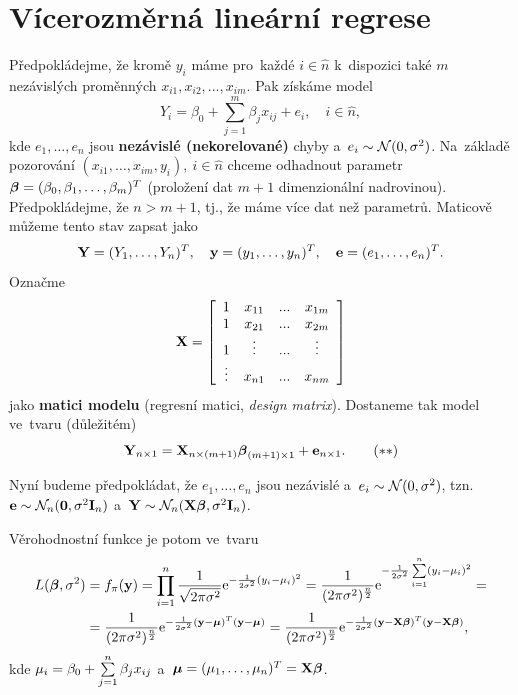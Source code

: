 \chapter{Vícerozměrná lineární regrese}

Předpokládejme, že kromě $y_i$ máme pro~každé $i\in\widehat{n}$ k~dispozici také $m$ nezávislých proměnných $x_{i1},x_{i2},\dots,x_{im}$. Pak získáme model
 $$ Y_i = \beta_0+\sum_{j = 1}^m \beta_j x_{ij}+e_i,\quad i\in\widehat{n}, $$
kde $e_1,\dots,e_n$ jsou \textbf{nezávislé (nekorelované)} chyby a~$e_i\sim\mathcal{N}(0,\sigma^2)$. Na~základě pozorování $(x_{i1},\dots,x_{im},y_i),~i\in\widehat{n}$ chceme odhadnout parametr $\boldsymbol{\beta} = (\beta_0,\beta_1,\dots,\beta_m)^T$ (proložení dat \linebreak $m+1$ dimenzionální nadrovinou). Předpokládejme, že $n>m+1$, tj., že máme více dat než parametrů. Maticově můžeme tento stav zapsat jako
 $$ \mathbf{Y} = (Y_1,\dots,Y_n)^T,\quad \mathbf{y} = (y_1,\dots,y_n)^T,\quad \mathbf{e} = (e_1,\dots,e_n)^T. $$
Označme
 $$ \mathbf{X} = \left[\begin{array}{cccc}
1 & x_{11} &... & x_{1m} \\
1 & x_{21} &... & x_{2m} \\
1 & \vdots &... & \vdots \\
 \vdots& x_{n1} &... & x_{nm}
\end{array}
 \right] $$ jako \textbf{matici modelu} (regresní matici, \textit{design matrix}). Dostaneme tak model ve~tvaru (důležitém)
  \begin{equation}\label{the_chosen_one}
 \mathbf{Y}_{n\times 1} = \mathbf{X}_{n\times(m+1)}\boldsymbol{\beta}_{(m+1)\times 1}+\mathbf{e}_{n\times 1}. \tag{$**$}
 \end{equation}

 Nyní budeme předpokládat, že $e_1,\dots,e_n$ jsou nezávislé a~$e_i \sim\mathcal{N}(0,\sigma^2)$, tzn. $\mathbf{e}\sim\mathcal{N}_n(\boldsymbol{0},\sigma^2 \textbf{I}_{n})$ a~$\mathbf{Y}\sim\mathcal{N}_n(\mathbf{X}\boldsymbol{\beta},\sigma^2 \textbf{I}_{n})$.

 Věrohodnostní funkce je potom ve~tvaru
 \begin{align*}
 L(\boldsymbol{\beta},\sigma^2)& = f_\pi(\mathbf{y}) = \prod_{i = 1}^n \frac{1}{\sqrt{2\pi\sigma^2}}\mathrm{e}^{-\frac{1}{2\sigma^2}(y_i-\mu_i)^2} = \frac{1}{(2\pi\sigma^2)^{\frac{n}{2}}}\mathrm{e}^{-\frac{1}{2\sigma^2}\sum\limits_{i=1}^{n} (y_i-\mu_i)^2} = \\ & = \frac{1}{(2\pi\sigma^2)^{\frac{n}{2}}}\mathrm{e}^{-\frac{1}{2\sigma^2}(\mathbf{y}-\boldsymbol{\mu})^T(\mathbf{y}-\boldsymbol{\mu})} = \frac{1}{(2\pi\sigma^2)^{\frac{n}{2}}}\mathrm{e}^{-\frac{1}{2\sigma^2}(\mathbf{y}-\mathbf{X}\boldsymbol{\beta})^T(\mathbf{y}-\mathbf{X}\boldsymbol{\beta})},
 \end{align*}
kde $\mu_i = \beta_0+\sum\limits_{j=1}^{n} \beta_j x_{ij}$ a~$\boldsymbol{\mu} = (\mu_1,\dots,\mu_n)^T = \mathbf{X}\boldsymbol{\beta}$.

